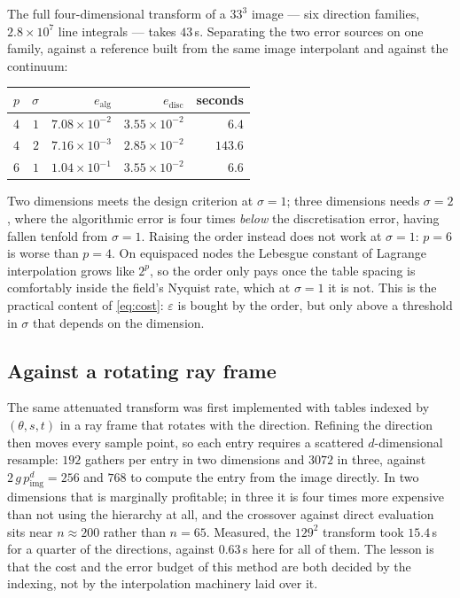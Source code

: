 \documentclass[11pt]{article}
\begin{document}
The full four-dimensional transform of a $33^3$ image --- six direction
families, $2.8\times10^7$ line integrals --- takes $43$\,s. Separating the two
error sources on one family, against a reference built from the same image
interpolant and against the continuum:

\begin{center}\small
\begin{tabular}{rr rrr}
\toprule
$p$ & $\sigma$ & $e_{\mathrm{alg}}$ & $e_{\mathrm{disc}}$ & seconds\\
\midrule
$4$ & $1$ & $7.08\!\times\!10^{-2}$ & $3.55\!\times\!10^{-2}$ & $6.4$\\
$4$ & $2$ & $7.16\!\times\!10^{-3}$ & $2.85\!\times\!10^{-2}$ & $143.6$\\
$6$ & $1$ & $1.04\!\times\!10^{-1}$ & $3.55\!\times\!10^{-2}$ & $6.6$\\
\bottomrule
\end{tabular}
\end{center}

Two dimensions meets the design criterion at $\sigma = 1$; three dimensions
needs $\sigma = 2$, where the algorithmic error is four times \emph{below} the
discretisation error, having fallen tenfold from $\sigma=1$. Raising the order
instead does not work at $\sigma = 1$: $p=6$ is worse than $p=4$. On equispaced
nodes the Lebesgue constant of Lagrange interpolation grows like $2^p$, so the
order only pays once the table spacing is comfortably inside the field's Nyquist
rate, which at $\sigma = 1$ it is not. This is the practical content of
\eqref{eq:cost}: $\varepsilon$ is bought by the order, but only above a
threshold in $\sigma$ that depends on the dimension.

\subsection{Against a rotating ray frame}

The same attenuated transform was first implemented with tables indexed by
$(\theta, s, t)$ in a ray frame that rotates with the direction. Refining the
direction then moves every sample point, so each entry requires a scattered
$d$-dimensional resample: $192$ gathers per entry in two dimensions and $3072$
in three, against $2\,g\,p_{\mathrm{img}}^d = 256$ and $768$ to compute the
entry from the image directly. In two dimensions that is marginally profitable;
in three it is four times more expensive than not using the hierarchy at all,
and the crossover against direct evaluation sits near $n\approx200$ rather than
$n = 65$. Measured, the $129^2$ transform took $15.4$\,s for a quarter of the
directions, against $0.63$\,s here for all of them. The lesson is that the cost
and the error budget of this method are both decided by the indexing, not by the
interpolation machinery laid over it.
\end{document}
